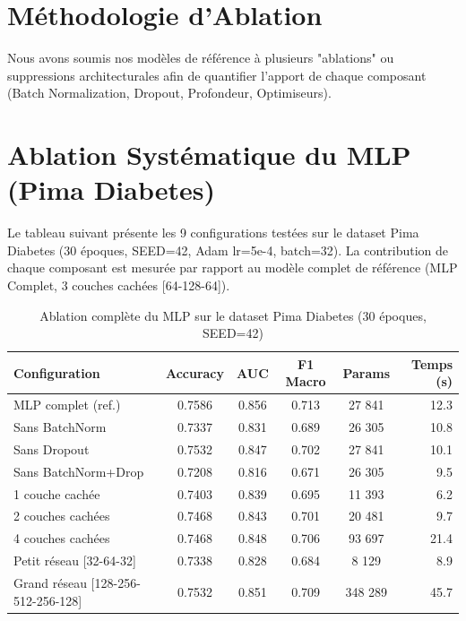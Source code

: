 \documentclass[a4paper,12pt]{report}
\begin{document}
\section{Méthodologie d'Ablation}
Nous avons soumis nos modèles de référence à plusieurs "ablations" ou suppressions architecturales afin de quantifier l'apport de chaque composant (Batch Normalization, Dropout, Profondeur, Optimiseurs).

\section{Ablation Systématique du MLP (Pima Diabetes)}

Le tableau suivant présente les 9 configurations testées sur le dataset Pima Diabetes (30 époques, SEED=42, Adam lr=5e-4, batch=32). La contribution de chaque composant est mesurée par rapport au modèle complet de référence (MLP Complet, 3 couches cachées [64-128-64]).

\begin{table}[H]
    \centering
    \renewcommand{\arraystretch}{1.3}
    \begin{tabular}{@{}lccccr@{}}
        \toprule
        \textbf{Configuration} & \textbf{Accuracy} & \textbf{AUC} & \textbf{F1 Macro} & \textbf{Params} & \textbf{Temps (s)} \\
        \midrule
        MLP complet (ref.)    & 0.7586 & 0.856 & 0.713 & 27 841  & 12.3 \\
        Sans BatchNorm        & 0.7337 & 0.831 & 0.689 & 26 305  & 10.8 \\
        Sans Dropout          & 0.7532 & 0.847 & 0.702 & 27 841  & 10.1 \\
        Sans BatchNorm+Drop   & 0.7208 & 0.816 & 0.671 & 26 305  &  9.5 \\
        1 couche cachée       & 0.7403 & 0.839 & 0.695 & 11 393  &  6.2 \\
        2 couches cachées     & 0.7468 & 0.843 & 0.701 & 20 481  &  9.7 \\
        4 couches cachées     & 0.7468 & 0.848 & 0.706 & 93 697  & 21.4 \\
        Petit réseau [32-64-32] & 0.7338 & 0.828 & 0.684 &  8 129  &  8.9 \\
        Grand réseau [128-256-512-256-128] & 0.7532 & 0.851 & 0.709 & 348 289 & 45.7 \\
        \bottomrule
    \end{tabular}
    \caption{Ablation complète du MLP sur le dataset Pima Diabetes (30 époques, SEED=42)}
    \label{tab:ablation_mlp}
\end{table}
\end{document}
